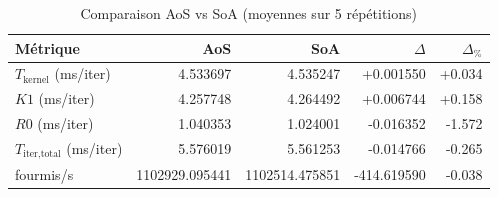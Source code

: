 \begin{table}[H]
\centering
\caption{Comparaison AoS vs SoA (moyennes sur 5 répétitions)}
\label{tab:vec-aos-soa-compare}
\begin{tabular}{@{}lrrrr@{}}
\toprule
\textbf{Métrique} & \textbf{AoS} & \textbf{SoA} & \textbf{$\Delta$} & \textbf{$\Delta_{\%}$} \\
\midrule
$T_{\text{kernel}}$ (ms/iter) & 4.533697 & 4.535247 & +0.001550 & +0.034 \\
$K1$ (ms/iter) & 4.257748 & 4.264492 & +0.006744 & +0.158 \\
$R0$ (ms/iter) & 1.040353 & 1.024001 & -0.016352 & -1.572 \\
$T_{\text{iter,total}}$ (ms/iter) & 5.576019 & 5.561253 & -0.014766 & -0.265 \\
fourmis/s & 1102929.095441 & 1102514.475851 & -414.619590 & -0.038 \\
\bottomrule
\end{tabular}
\end{table}

